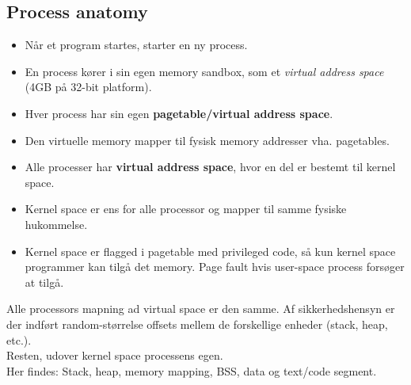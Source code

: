 
\subsection{Process anatomy}
\begin{itemize}
	\item Når et program startes, starter en ny process.
	\item En process kører i sin egen memory sandbox, som et \textit{virtual address space} (4GB på 32-bit platform).
	\item Hver process har sin egen \textbf{pagetable/virtual address space}.
	\item Den virtuelle memory mapper til fysisk memory addresser vha. pagetables.
	\item Alle processer har \textbf{virtual address space}, hvor en del er bestemt til kernel space.
	\item Kernel space er ens for alle processor og mapper til samme fysiske hukommelse.
	\item Kernel space er flagged i pagetable med privileged code, så kun kernel space programmer kan tilgå det memory. Page fault hvis user-space process forsøger at tilgå.
\end{itemize}


Alle processors mapning ad virtual space er den samme. Af sikkerhedshensyn er der indført random-størrelse offsets mellem de forskellige enheder (stack, heap, etc.).\\

Resten, udover kernel space processens egen.\\

Her findes: Stack, heap, memory mapping, BSS, data og text/code segment.


